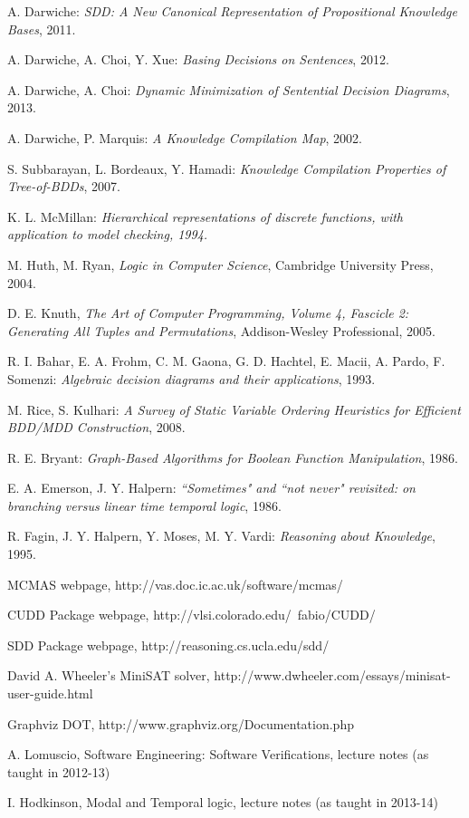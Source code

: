\documentclass[11pt]{article}
\begin{document}
\begin{thebibliography}{9}


A. Darwiche:\emph{ SDD: A New Canonical Representation of Propositional Knowledge Bases}, 2011.

A. Darwiche, A. Choi, Y. Xue: \emph{Basing Decisions on Sentences}, 2012.

A. Darwiche, A. Choi: \textit{Dynamic Minimization of Sentential Decision Diagrams}, 2013.

  A. Darwiche, P. Marquis:
  \emph{A Knowledge Compilation Map}, 2002.

S. Subbarayan, L. Bordeaux, Y. Hamadi:\textit{
Knowledge Compilation Properties of Tree-of-BDDs}, 2007.

K. L. McMillan:\textit{ Hierarchical representations of discrete functions, with application to model checking, 1994.
}

 M. Huth, M. Ryan, 
\emph{Logic in Computer Science},
Cambridge University Press, 2004.

 D. E. Knuth, \textit{The Art of Computer Programming, Volume
4, Fascicle 2: Generating All Tuples and Permutations}, Addison-Wesley Professional, 2005.

  R. I. Bahar, E. A. Frohm, C. M. Gaona, G. D. Hachtel, E. Macii, A. Pardo, F. Somenzi:\textit{
Algebraic decision diagrams and their applications}, 1993.

 M. Rice, S. Kulhari:\textit{ A Survey of Static Variable Ordering Heuristics for Efficient BDD/MDD Construction}, 2008.

 R. E. Bryant: \textit{Graph-Based Algorithms
for Boolean Function Manipulation}, 1986.

  	E. A. Emerson, J. Y. Halpern:\textit{
``Sometimes" and ``not never" revisited: on branching versus linear time temporal logic}, 1986.
	
R. Fagin, J. Y. Halpern, Y. Moses, M. Y. Vardi: \textit{Reasoning about Knowledge}, 1995.


 MCMAS webpage, http://vas.doc.ic.ac.uk/software/mcmas/

 CUDD Package webpage, http://vlsi.colorado.edu/~fabio/CUDD/

 SDD Package webpage, http://reasoning.cs.ucla.edu/sdd/

 David A. Wheeler's MiniSAT solver,  http://www.dwheeler.com/essays/minisat-user-guide.html

Graphviz DOT, http://www.graphviz.org/Documentation.php

 A. Lomuscio, Software Engineering: Software Verifications, lecture notes (as taught in 2012-13)

 I. Hodkinson, Modal and Temporal logic, lecture notes (as taught in 2013-14)

\end{thebibliography}
\end{document}
